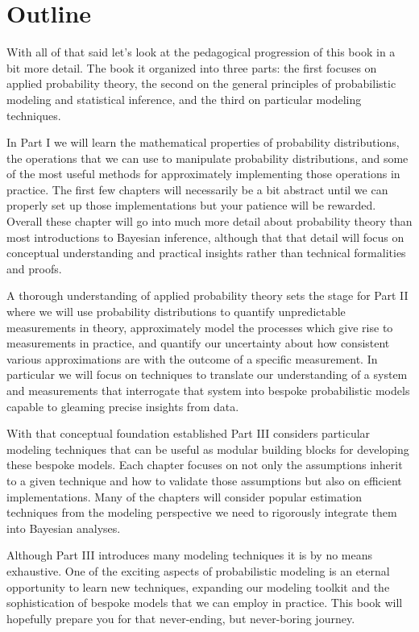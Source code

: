 \documentclass[
  letterpaper,
  DIV=11,
  numbers=noendperiod]{scrartcl}
\begin{document}
\hypertarget{outline}{%
\section{Outline}\label{outline}}

With all of that said let's look at the pedagogical progression of this
book in a bit more detail. The book it organized into three parts: the
first focuses on applied probability theory, the second on the general
principles of probabilistic modeling and statistical inference, and the
third on particular modeling techniques.

In Part I we will learn the mathematical properties of probability
distributions, the operations that we can use to manipulate probability
distributions, and some of the most useful methods for approximately
implementing those operations in practice. The first few chapters will
necessarily be a bit abstract until we can properly set up those
implementations but your patience will be rewarded. Overall these
chapter will go into much more detail about probability theory than most
introductions to Bayesian inference, although that that detail will
focus on conceptual understanding and practical insights rather than
technical formalities and proofs.

A thorough understanding of applied probability theory sets the stage
for Part II where we will use probability distributions to quantify
unpredictable measurements in theory, approximately model the processes
which give rise to measurements in practice, and quantify our
uncertainty about how consistent various approximations are with the
outcome of a specific measurement. In particular we will focus on
techniques to translate our understanding of a system and measurements
that interrogate that system into bespoke probabilistic models capable
to gleaming precise insights from data.

With that conceptual foundation established Part III considers
particular modeling techniques that can be useful as modular building
blocks for developing these bespoke models. Each chapter focuses on not
only the assumptions inherit to a given technique and how to validate
those assumptions but also on efficient implementations. Many of the
chapters will consider popular estimation techniques from the modeling
perspective we need to rigorously integrate them into Bayesian analyses.

Although Part III introduces many modeling techniques it is by no means
exhaustive. One of the exciting aspects of probabilistic modeling is an
eternal opportunity to learn new techniques, expanding our modeling
toolkit and the sophistication of bespoke models that we can employ in
practice. This book will hopefully prepare you for that never-ending,
but never-boring journey.
\end{document}
